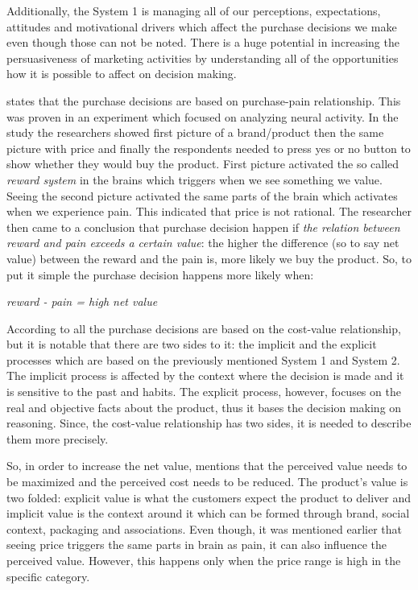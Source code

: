 Additionally, the System 1 is managing all of our perceptions, expectations, attitudes and motivational drivers which affect the purchase decisions we make even though those can not be noted. There is a huge potential in increasing the persuasiveness of marketing activities by understanding all of the opportunities how it is possible to affect on decision making. \parencite{Decoded:2013}

\textcite{Decoded:2013} states that the purchase decisions are based on purchase-pain relationship. This was proven in an experiment which focused on analyzing neural activity. In the study the researchers showed first picture of a brand/product then the same picture with price and finally the respondents needed to press yes or no button to show whether they would buy the product. First picture activated the so called \emph{reward system} in the brains which triggers when we see something we value. Seeing the second picture activated the same parts of the brain which activates when we experience pain. This indicated that price is not rational. The researcher then came to a conclusion that purchase decision happen if \emph{the relation between reward and pain exceeds a certain value}: the higher the difference (so to say net value) between the reward and the pain is, more likely we buy the product. So, to put it simple the purchase decision happens more likely when: \begin{center}\emph{reward - pain = high net value}\end{center}

According to \textcite{Decoded:2013} all the purchase decisions are based on the cost-value relationship, but it is notable that there are two sides to it: the implicit and the explicit processes which are based on the previously mentioned System 1 and System 2. The implicit process is affected by the context where the decision is made and it is sensitive to the past and habits. The explicit process, however, focuses on the real and objective facts about the product, thus it bases the decision making on reasoning. Since, the cost-value relationship has two sides, it is needed to describe them more precisely.

So, in order to increase the net value, \textcite{Decoded:2013} mentions that the perceived value needs to be maximized and the perceived cost needs to be reduced. The product's value is two folded: explicit value is what the customers expect the product to deliver and implicit value is the context around it which can be formed through brand, social context, packaging and associations. Even though, it was mentioned earlier that seeing price triggers the same parts in brain as pain, it can also influence the perceived value. However, this happens only when the price range is high in the specific category.

